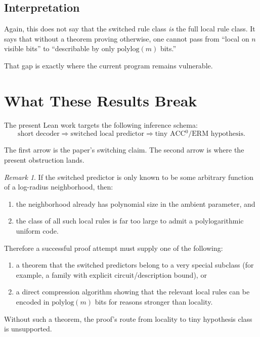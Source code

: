 \documentclass[11pt]{article}
\theoremstyle{remark}
\newtheorem{remark}[theorem]{Remark}
\begin{document}
\subsection{Interpretation}

Again, this does not say that the switched rule class \emph{is} the full local rule class.  It says
that without a theorem proving otherwise, one cannot pass from
``local on $n$ visible bits'' to ``describable by only $\mathrm{polylog}(m)$ bits.''

That gap is exactly where the current program remains vulnerable.

\section{What These Results Break}

The present Lean work targets the following inference schema:
\[
  \text{short decoder}
  \Longrightarrow
  \text{switched local predictor}
  \Longrightarrow
  \text{tiny ACC$^0$/ERM hypothesis}.
\]

The first arrow is the paper's switching claim.  The second arrow is where the present obstruction
lands.

\begin{remark}
If the switched predictor is only known to be some arbitrary function of a log-radius neighborhood,
then:
\begin{enumerate}[leftmargin=1.5em]
  \item the neighborhood already has polynomial size in the ambient parameter, and
  \item the class of all such local rules is far too large to admit a polylogarithmic uniform code.
\end{enumerate}
\end{remark}

Therefore a successful proof attempt must supply one of the following:
\begin{enumerate}[leftmargin=1.5em]
  \item a theorem that the switched predictors belong to a very special subclass
  (for example, a family with explicit circuit/description bound), or
  \item a direct compression algorithm showing that the relevant local rules can be encoded in
  \(\mathrm{polylog}(m)\) bits for reasons stronger than locality.
\end{enumerate}

Without such a theorem, the proof's route from locality to tiny hypothesis class is unsupported.
\end{document}
